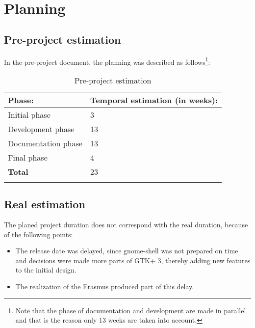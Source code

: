 \chapter{Planning}\label{chap:planning}

\section{Pre-project estimation}

In the pre-project document,  the planning was described as follows\footnote{Note that the phase of documentation and development are made in parallel and that is the reason only 13 weeks are taken into account.}:

\begin{table}[H]
  \begin{center}
    \begin{tabularx}{0.60\textwidth}{|X|X|}
      \firsthline
      \textbf{Phase:} & \textbf{Temporal estimation (in weeks):} \\
      \hline
      Initial phase & 3 \\
      \hline
      Development phase & 13 \\
      \hline
      Documentation phase & 13 \\
      \hline
      Final phase & 4 \\
      \hline
      \textbf{Total} & 23 \\
      \lasthline
    \end{tabularx}
    \caption{Pre-project estimation}
  \end{center}
\end{table}

\newpage
{}

\newpage
{}

\newpage
\section{Real estimation}

The planed project duration does not correspond with the real duration, because of the following points:
\begin{itemize}
  \item The \GNOME release date was delayed, since gnome-shell was not prepared on time and decisions were made 
    more parts of GTK+ 3, thereby adding new features to the initial design.
  \item The realization of the Erasmus produced part of this delay.
\end{itemize}

